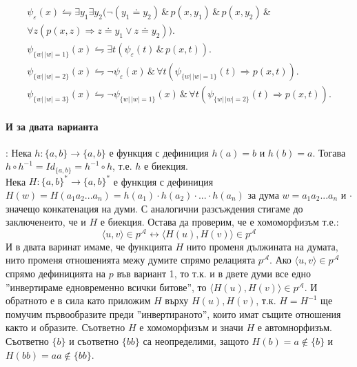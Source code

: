 \documentclass[12pt]{article}
\def\Land{\,\&\,}
\begin{document}
\begin{addmargin}[1em]{2em}
    \begin{gather*}
        \psi_{\varepsilon}(x) \leftrightharpoons \exists y_1 \exists y_2 (\neg(y_1 \doteq y_2) \Land p(x, y_1) \Land p(x, y_2) \Land \\\forall z(p(x, z) \Rightarrow z \doteq y_1 \lor z \doteq y_2)).\\
        \psi_{\{w|\,| w |=1\}}(x) \leftrightharpoons \exists t (\psi_{\varepsilon}(t) \Land p(x, t)).\\
        \psi_{\{w|\,| w |=2\}}(x) \leftrightharpoons \neg \psi_{\varepsilon}(x) \Land \forall t (\psi_{\{w|\,| w |=1\}}(t) \Rightarrow p(x, t)).\\
        \psi_{\{w|\,| w |=3\}}(x) \leftrightharpoons \neg \psi_{\{w|\,| w |=1\}}(x) \Land \forall t (\psi_{\{w|\,| w |=2\}}(t) \Rightarrow p(x, t)).
    \end{gather*}
\end{addmargin}

\paragraph{\hspace{0.5em} И за двата варианта}: Нека $h: \{a,b\} \rightarrow \{a,b\}$ е функция с дефиниция $h(a)=b$ и $h(b)=a$. Тогава $h \circ h^{-1} = Id_{\{a,b\}} = h^{-1} \circ h$, т.е. $h$ е биекция.\\ Нека  $H: \{a,b\}^{*} \rightarrow \{a,b\}^{*}$ е функция с дефиниция $H(w)=H(a_1a_2...a_n)=h(a_1)\cdot h(a_2)\cdot...\cdot h(a_n)$ за дума $w=a_1a_2...a_n$ и $\cdot$ значещо конкатенация на думи. С аналогични разсъждения стигаме до заключенеито, че и $H$ е биекция. Остава да проверим, че е хомоморфизъм т.е.:
\begin{equation*}
    \langle u,v\rangle \in p^{\mathcal{A}} \leftrightarrow \langle H(u),H(v)\rangle \in p^{\mathcal{A}}
\end{equation*}
И в двата варинат имаме, че функцията $H$ нито променя дължината на думата, нито променя отношенията межу думите спрямо релацията $p^{\mathcal{A}}$. Ако $\langle u,v\rangle \in p^{\mathcal{A}}$ спрямо дефиницията на $p$ във вариант 1, то т.к. и в двете думи все едно ''инвертираме едновременно всички битове'', то $\langle H(u),H(v)\rangle \in p^{\mathcal{A}}$. И обратното е в сила като приложим $H$ върху $H(u),H(v)$, т.к. $H=H^{-1}$ ще помучим първообразите преди ''инвертираното'', които имат същите отношения както и образите. Съответно $H$ е хомоморфизъм и значи $H$ е автомнорфизъм. Съответно $\{b\}$ и съответно $\{bb\}$ са неопределими, защото $H(b) = a \not\in \{b\}$ и $H(bb) = aa \not\in \{bb\}$.
\end{document}
